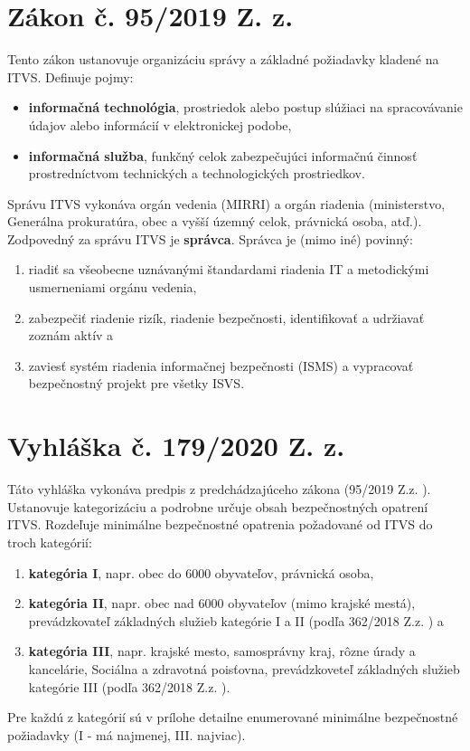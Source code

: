 \section{Zákon č. 95/2019 Z. z.}
Tento zákon ustanovuje organizáciu správy a základné požiadavky kladené na ITVS. Definuje pojmy:
\begin{itemize}
  \item \textbf{informačná technológia}, prostriedok alebo postup slúžiaci na spracovávanie údajov alebo informácií 
    v elektronickej podobe, \item \textbf{informačná služba}, funkčný celok zabezpečujúci informačnú činnosť 
      prostredníctvom technických a technologických prostriedkov.
\end{itemize}
Správu ITVS vykonáva orgán vedenia (MIRRI) a orgán riadenia (ministerstvo, Generálna prokuratúra, obec a vyšší územný 
celok, právnická osoba, atď.). Zodpovedný za správu ITVS je \textbf{správca}. Správca je (mimo iné) povinný:
\begin{enumerate}[-]
    \item riadiť sa všeobecne uznávanými štandardami riadenia IT a metodickými usmerneniami orgánu vedenia,
    \item zabezpečiť riadenie rizík, riadenie bezpečnosti, identifikovať a udržiavať zoznám aktív a
    \item zaviesť systém riadenia informačnej bezpečnosti (ISMS) a vypracovať bezpečnostný projekt pre všetky ISVS.
\end{enumerate}

\section{Vyhláška č. 179/2020 Z. z.}

Táto vyhláška vykonáva predpis z predchádzajúceho zákona (95/2019 Z.z. \cite{95/2019}). Ustanovuje kategorizáciu a 
podrobne určuje obsah bezpečnostných opatrení ITVS. Rozdeľuje minimálne bezpečnostné opatrenia požadované od ITVS 
do troch kategórií:
\begin{enumerate}[-]
  \item \textbf{kategória I}, napr. obec do 6000 obyvateľov, právnická osoba,
  \item \textbf{kategória II}, napr. obec nad 6000 obyvateľov (mimo krajské mestá), 
    prevádzkovateľ základných služieb kategórie I a II (podľa 362/2018 Z.z. \cite{362/2018}) a
  \item \textbf{kategória III}, napr. krajské mesto, samosprávny kraj, rôzne úrady a kancelárie, 
    Sociálna a zdravotná poisťovna, prevádzkoveteľ základných služieb kategórie III (podľa 362/2018 Z.z. \cite{362/2018}).
\end{enumerate}
Pre každú z kategórií sú v prílohe detailne enumerované minimálne bezpečnostné požiadavky (I - má najmenej, III. najviac).


